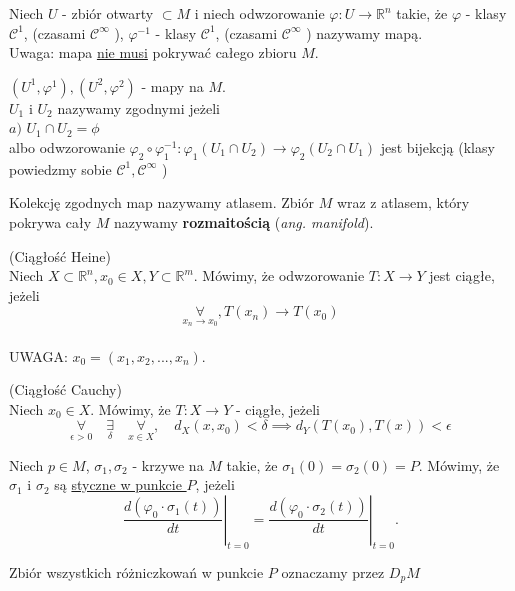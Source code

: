 \documentclass{article}
\begin{document}
\begin{definicja}Niech $U$ - zbiór otwarty $\subset M$ i niech odwzorowanie $\varphi: U\to \mathbb{R}^n$ takie, że $\varphi$ - klasy $\mathcal{C}^1$, (czasami $\mathcal{C}^\infty$ ), $\varphi^{-1}$ - klasy $\mathcal{C}^1$, (czasami $\mathcal{C}^\infty$ ) nazywamy mapą.\\Uwaga: mapa \underline{nie musi} pokrywać całego zbioru $M$.\end{definicja}\begin{definicja}$(U^1,\varphi^1), (U^2,\varphi^2)$ - mapy na $M$.\\$U_1$ i $U_2$ nazywamy zgodnymi jeżeli\\$a)$ $U_1\cap U_2 = \phi$\\albo odwzorowanie $\varphi_2 \circ \varphi_1^{-1}: \varphi_1(U_1\cap U_2)\to \varphi_2(U_2\cap U_1)$ jest bijekcją (klasy powiedzmy sobie $\mathcal{C}^1, \mathcal{C}^{\infty}$ )\end{definicja}\begin{definicja}Kolekcję zgodnych map nazywamy atlasem. Zbiór $M$ wraz z atlasem, który pokrywa cały $M$ nazywamy \textbf{rozmaitością} (\textit{ang. manifold}).\end{definicja}
\begin{definicja}(Ciągłość Heine)\\Niech $X\subset\mathbb{R}^n, x_{0} \in X, Y\subset\mathbb{R}^m$. Mówimy, że odwzorowanie $T: X\rightarrow Y$ jest ciągłe, jeżeli $$\underset{x_n \to x_0}{\forall}, T(x_{n})\rightarrow T(x_{0})$$\\UWAGA: $x_{0} = (x_{1}, x_{2}, ..., x_{n})$.\end{definicja}\begin{definicja}(Ciągłość Cauchy)\\Niech $x_{0}\in X$. Mówimy, że $T: X\to Y$ - ciągłe, jeżeli$$\underset{\epsilon > 0}{\forall} \quad\underset{\delta}{\exists} \quad\underset{x\in X}{\forall}, \quad d_{X} (x,x_{0}) < \delta \implies d_{Y} (T(x_{0}), T(x)) < \epsilon$$\end{definicja}
\begin{definicja}Niech $p\in M$, $\sigma_1,\sigma_2$ - krzywe na $M$ takie, że $\sigma_1(0) = \sigma_2(0) = P$. Mówimy, że $\sigma_1$ i $\sigma_2$ są \underline{styczne w punkcie $P$}, jeżeli\[\left.\frac{d(\varphi_0\cdot \sigma_1(t))}{d t}\right|_{t=0} = \left.\frac{d(\varphi_0 \cdot \sigma_2(t))}{dt}\right|_{t=0}.\]\end{definicja}\begin{definicja}Zbiór wszystkich różniczkowań w punkcie $P$ oznaczamy przez $D_pM$\end{definicja}
\end{document}
